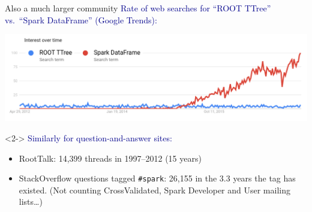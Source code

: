 \documentclass[aspectratio=169]{beamer}
\begin{document}
\begin{frame}{Also a much larger community}
\vspace{0.35 cm}
\textcolor{darkblue}{Rate of web searches for ``ROOT TTree'' vs.\ ``Spark DataFrame'' (Google Trends):}

\includegraphics[width=\linewidth]{root-spark-google-trends.png}

\vfill
\begin{uncoverenv}<2->
\textcolor{darkblue}{Similarly for question-and-answer sites:}
\begin{itemize}
\item RootTalk: 14,399 threads in 1997--2012 (15 years)
\item StackOverflow questions tagged {\tt \small \#spark}: 26,155 in the 3.3 years the tag has existed. (Not counting CrossValidated, Spark Developer and User mailing lists\ldots)
\end{itemize}
\end{uncoverenv}

\vfill
{}
\end{frame}
\end{document}
